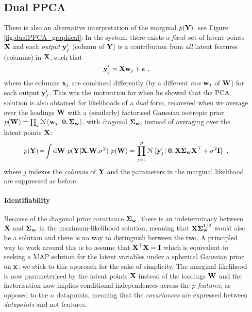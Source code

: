 
    \subsection{Dual PPCA}
      There is also an alternative interpretation of the marginal $p(\mathbf{Y})$, see Figure \ref{fig:dualPPCA_graphical}: In the system, there exists a \emph{fixed}\footnotemark ~set of latent points $\mathbf{X}$ and each \emph{output} $\mathbf{y}^{\prime}_j$ (column of $\mathbf{Y}$) is a contribution from \emph{all} latent features (columns) in $\mathbf{X}$, such that
      \[
	\mathbf{y}^{\prime}_j = \mathbf{X} \mathbf{w}_j + \boldsymbol{\epsilon} ~,
      \]
      where the columns $\mathbf{x}_j$ are combined differently (by a different \emph{row} $\mathbf{w}_j$ of $\mathbf{W}$) for each output $\mathbf{y}^{\prime}_j$. This was the motivation for \citet{Lawrence:pnpca05} when he showed that the PCA solution is also obtained for likelihoods of a \emph{dual} form, recovered when we average over the loadings $\mathbf{W}$ with a (similarly) factorised Gaussian isotropic prior $p(\mathbf{W}) = \prod_j \mathcal{N} \left( \mathbf{w}_j \,|\, \mathbf{0}, \mathbf{\Sigma}_{\mathbf{w}} \right)$, with diagonal $\mathbf{\Sigma}_{\mathbf{w}}$, instead of averaging over the latent points $\mathbf{X}$:
      \begin{equation} \label{equ:chap3_dualpca_marginal_y}
	p(\mathbf{Y}) \!=\! \int \textrm{d}\mathbf{W} ~ p(\mathbf{Y} | \mathbf{X},\! \mathbf{W}, \!\sigma^2) ~ p(\mathbf{W})
	= \prod_{j=1}^p \mathcal{N} \left( \mathbf{y}^{\prime}_j \,|\, \mathbf{0},  \mathbf{X} \mathbf{\Sigma}_{\mathbf{w}} \mathbf{X}^\top + \sigma^2\mathbf{I} \right) ~,
      \end{equation}
      where $j$ indexes the \emph{columns} of $\mathbf{Y}$ and the parameters in the marginal likelihood are suppressed as before.

      \paragraph{Identifiability} Because of the diagonal prior covariance $\mathbf{\Sigma}_{\mathbf{w}}$, there is an indeterminacy between $\mathbf{X}$ and $\mathbf{\Sigma}_{\mathbf{w}}$ in the maximum-likelihood solution, meaning that $\mathbf{X}\mathbf{\Sigma}_{\mathbf{w}}^{1/2}$ would also be a solution and there is no way to distinguish between the two. A principled way to work around this is to assume that $\mathbf{X}^\top\mathbf{X} = \mathbf{I}$ which is equivalent to seeking a MAP solution for the latent variables under a spherical Gaussian prior on $\mathbf{x}$; we stick to this approach for the sake of simplicity. The marginal likelihood is now parameterised by the latent points $\mathbf{X}$ instead of the loadings $\mathbf{W}$ and the factorisation now implies conditional independences across the $p$ \textit{features}, as opposed to the $n$ datapoints, meaning that the \emph{covariances} are expressed between \emph{datapoints} and not features.

